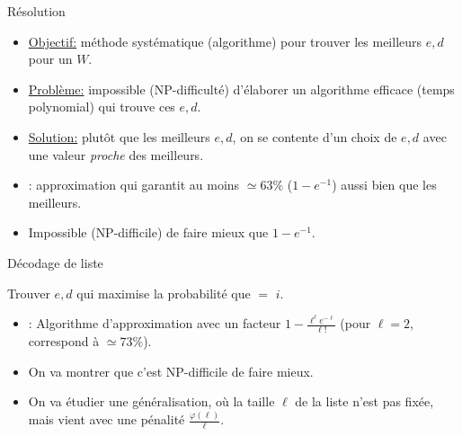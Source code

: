 \documentclass{beamer}
\theoremstyle{definition}
\theoremstyle{remark}
\begin{document}
\begin{frame}{Résolution \cite{BF18}}
  \begin{itemize}
  \item \underline{Objectif:} méthode systématique (algorithme) pour trouver les meilleurs $e,d$ pour un $W$.
    \pause
  \item \underline{Problème:} impossible (\textrm{NP}-difficulté) d'élaborer un algorithme efficace (temps polynomial) qui trouve ces $e,d$.
    \bigskip
    \pause
  \item \underline{Solution:} plutôt que les meilleurs $e,d$, on se contente d'un choix de $e,d$ avec une valeur \emph{proche} des meilleurs.
    
    \pause
    \bigskip

  \item \cite{BF18}: approximation qui garantit au moins $\simeq 63\%$ ($1-e^{-1}$) aussi bien que les meilleurs.
  \item Impossible (\textrm{NP}-difficile) de faire mieux que $1-e^{-1}$.
  \end{itemize}
\end{frame}

\begin{frame}{Décodage de liste}
  \begin{center}

    \bigskip
    Trouver $e,d$ qui maximise la probabilité que  $=$ \alert{$i$}.
  \end{center}
  
  \pause\pause\pause
  
  \begin{itemize}
  \item \cite{BFGG20}: Algorithme d'approximation avec un facteur $1-\frac{\ell^{\ell}e^{-\ell}}{\ell!}$ (pour $\ell=2$, correspond à $\simeq 73\%$).
    \pause
  \item On va montrer que c'est \textrm{NP}-difficile de faire mieux.
    \pause
  \item On va étudier une généralisation, où la taille $\ell$ de la liste n'est pas fixée, mais vient avec une pénalité $\frac{\varphi(\ell)}{\ell}$.
  \end{itemize}
\end{frame}
\end{document}
